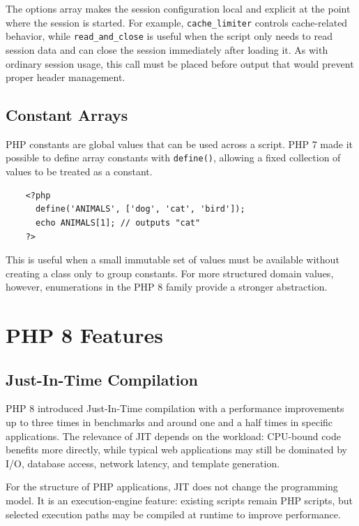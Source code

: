 \documentclass{scrbook}
\begin{document}
	The options array makes the session configuration local and explicit at the point where the session is started. For example, \texttt{cache\_limiter} controls cache-related behavior, while \texttt{read\_and\_close} is useful when the script only needs to read session data and can close the session immediately after loading it. As with ordinary session usage, this call must be placed before output that would prevent proper header management.
	
	\subsection{Constant Arrays}
	
	PHP constants are global values that can be used across a script. PHP 7 made it possible to define array constants with \texttt{define()}, allowing a fixed collection of values to be treated as a constant.
	
	\begin{lstlisting}
	<?php
	  define('ANIMALS', ['dog', 'cat', 'bird']);
	  echo ANIMALS[1]; // outputs "cat"
	?>
	\end{lstlisting}
	
	This is useful when a small immutable set of values must be available without creating a class only to group constants. For more structured domain values, however, enumerations in the PHP 8 family provide a stronger abstraction.
	
	\section{PHP 8 Features}
	
	\subsection{Just-In-Time Compilation}
	
	PHP 8 introduced Just-In-Time compilation with a performance improvements up to three times in benchmarks and around one and a half times in specific applications. The relevance of JIT depends on the workload: CPU-bound code benefits more directly, while typical web applications may still be dominated by I/O, database access, network latency, and template generation.
	
	For the structure of PHP applications, JIT does not change the programming model. It is an execution-engine feature: existing scripts remain PHP scripts, but selected execution paths may be compiled at runtime to improve performance.
	
\end{document}

